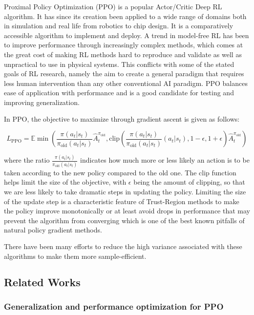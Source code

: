 Proximal Policy Optimization\cite{schulman2017proximal} (PPO) is a popular Actor/Critic Deep RL algorithm. It has since its creation been applied to a wide range of domains both in simulation and real life from robotics\cite{andrychowicz2020learning} to chip design\cite{mirhoseini2021graph}. It is a comparatively accessible algorithm to implement and deploy. A trend in model-free RL has been to improve performance through increasingly complex methods, which comes at the great cost of making RL methods hard to reproduce and validate as well as unpractical to use in physical systems. This conflicts with some of the stated goals of RL research, namely the aim to create a general paradigm that requires less human intervention than any other conventional AI paradigm. PPO balances ease of application with performance and is a good candidate for testing and improving generalization.

In PPO, the objective to maximize through gradient ascent is given as follows:

\[
L_{\text{PPO}} = \mathbb{E}\min\left(\frac{\pi(a_t | s_t)}{\pi_{\text{old}}(a_t|s_t)}\hat{A}^{\pi_{\text{old}}}_t, \text{clip}\left(\frac{\pi(a_t | s_t)}{\pi_\text{old}(a_t | s_t)}(a_t | s_t), 1 - \epsilon, 1 + \epsilon \right) \hat{A}^{\pi_{\text{old}}}_t \right)
\] 

where the ratio $\frac{\pi(a_t | s_t)}{\pi_{\text{old}}(a_t|s_t)}$ indicates how much more or less likely an action is to be taken according to the new policy compared to the old one. The clip function helps limit the size of the objective, with $\epsilon$ being the amount of clipping, so that we are less likely to take dramatic steps in updating the policy. Limiting the size of the update step is a characteristic feature of Trust-Region\cite{Schulman2015TrustRP} methods to make the policy improve monotonically or at least avoid drops in performance that may prevent the algorithm from converging which is one of the best known pitfalls of natural policy gradient methods.

There have been many efforts to reduce the high variance associated with these algorithms to make them more sample-efficient.

\subsection{Related Works}

\subsubsection*{Generalization and performance optimization for PPO}

